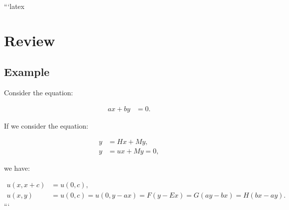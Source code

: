 ```latex
\section*{Review}

\subsection*{Example}

Consider the equation:

\begin{align}
    ax + by &= 0.
\end{align}

If we consider the equation:

\begin{align}
    y &= Hx + My, \\
    y &= ux + My = 0,
\end{align}

we have:

\begin{align}
    u(x, x + c) &= u(0, c), \\
    u(x, y) &= u(0, c) = u(0, y - ax) = F(y - Ex) = G(ay - bx) = H(bx - ay).
\end{align}
```
